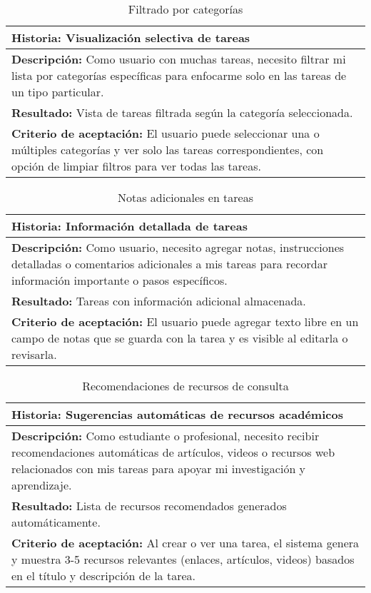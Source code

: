 \documentclass[11pt]{article}
\begin{document}
\begin{table}[H]
    \centering
    \begin{tabular}{|p{15cm}|}
    \hline
    \textbf{Historia: } Visualización selectiva de tareas\\
    \hline
    \textbf{Descripción: }Como usuario con muchas tareas, necesito filtrar mi lista por categorías 
    específicas para enfocarme solo en las tareas de un tipo particular.\\
    \hline
    \textbf{Resultado: } Vista de tareas filtrada según la categoría seleccionada.\\
    \hline
    \textbf{Criterio de aceptación: } El usuario puede seleccionar una o múltiples categorías y ver solo las tareas 
    correspondientes, con opción de limpiar filtros para ver todas las tareas.\\
    \hline
    \end{tabular}
    \caption{Filtrado por categorías}
    \label{user-story5}
\end{table}

\begin{table}[H]
    \centering
    \begin{tabular}{|p{15cm}|}
    \hline
    \textbf{Historia: } Información detallada de tareas\\
    \hline
    \textbf{Descripción: }Como usuario, necesito agregar notas, instrucciones detalladas o comentarios adicionales a
     mis tareas para recordar información importante o pasos específicos.\\
    \hline
    \textbf{Resultado: } Tareas con información adicional almacenada.\\
    \hline
    \textbf{Criterio de aceptación: } El usuario puede agregar texto libre en un campo de notas que se guarda 
    con la tarea y es visible al editarla o revisarla.\\
    \hline
    \end{tabular}
    \caption{Notas adicionales en tareas}
    \label{user-story6}
\end{table}

\begin{table}[H]
    \centering
    \begin{tabular}{|p{15cm}|}
    \hline
    \textbf{Historia: }Sugerencias automáticas de recursos académicos\\
    \hline
    \textbf{Descripción: }Como estudiante o profesional, necesito recibir recomendaciones automáticas de artículos, videos o 
    recursos web relacionados con mis tareas para apoyar mi investigación y aprendizaje.\\
    \hline
    \textbf{Resultado: }Lista de recursos recomendados generados automáticamente.\\
    \hline
    \textbf{Criterio de aceptación: } Al crear o ver una tarea, el sistema genera y muestra 3-5 recursos relevantes
     (enlaces, artículos, videos) basados en el título y descripción de la tarea.\\
    \hline
    \end{tabular}
    \caption{Recomendaciones de recursos de consulta}
    \label{user-story7}
\end{table}
\end{document}
